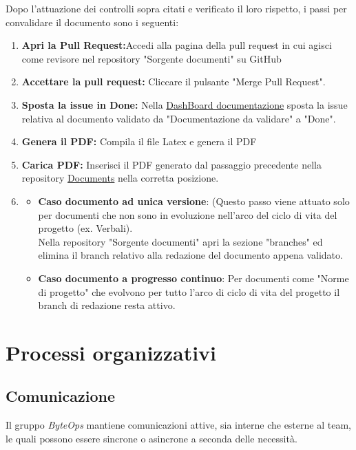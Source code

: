 \documentclass{article}
\begin{document}
Dopo l'attuazione dei controlli sopra citati e verificato il loro rispetto, i passi per convalidare il documento sono i seguenti:
\begin{enumerate}
 \item \textbf{Apri la Pull Request:}Accedi alla pagina della pull request in cui agisci come revisore nel repository "Sorgente documenti" su GitHub 
    \item \textbf{Accettare la pull request:} Cliccare il pulsante "Merge Pull Request".
     \item \textbf{Sposta la issue in Done:} Nella \href{https://github.com/orgs/ByteOps-swe/projects/1/views/1}{DashBoard documentazione} sposta la issue relativa al documento validato da "Documentazione da validare" a "Done".
     \item \textbf{Genera il PDF:} Compila il file Latex e genera il PDF 
     \item \textbf{Carica PDF:} Inserisci il PDF generato dal passaggio precedente nella repository \href{https://github.com/ByteOps-swe/Documents}{Documents} nella corretta posizione.
     \item \begin{itemize} \item \textbf{Caso documento ad unica versione}:
      (Questo passo viene attuato solo per documenti che non sono in evoluzione nell'arco del ciclo di vita del progetto (ex. Verbali).\\Nella repository "Sorgente documenti" apri la sezione "branches" ed elimina il branch relativo alla redazione del documento appena validato.
    
      \item \textbf{Caso documento a progresso continuo}: Per documenti come "Norme di progetto" che evolvono per tutto l'arco di ciclo di vita del progetto il branch di redazione resta attivo. 
    \end{itemize}
     
\end{enumerate}




\section{Processi organizzativi}
    \subsection{Comunicazione}
    Il gruppo \textit{ByteOps} mantiene comunicazioni attive, sia interne che esterne al team, le quali possono essere sincrone o asincrone a seconda delle necessità.
\end{document}
